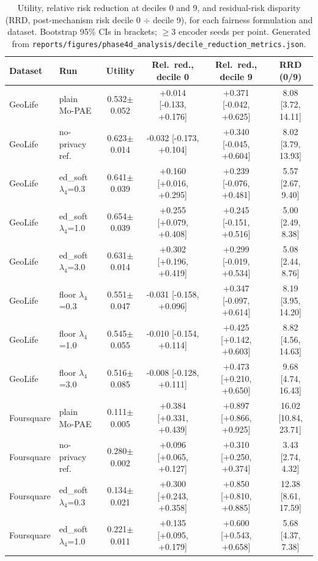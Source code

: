 \begin{table}[t]
\centering
\caption{Utility, relative risk reduction at deciles 0 and 9, and residual-risk disparity (RRD, post-mechanism risk decile 0 $\div$ decile 9), for each fairness formulation and dataset. Bootstrap 95\% CIs in brackets; $\geq 3$ encoder seeds per point. Generated from \texttt{reports/figures/phase4d\_analysis/decile\_reduction\_metrics.json}.}
\label{tab:04d-decile-reduction}
\small
\begin{tabular}{@{}llcccc@{}}
\toprule
Dataset & Run & Utility & Rel.\ red., decile 0 & Rel.\ red., decile 9 & RRD (0/9) \\
\midrule
GeoLife & plain Mo-PAE & 0.532$\pm$0.052 & +0.014 [-0.133, +0.176] & +0.371 [-0.042, +0.625] & 8.08 [3.72, 14.11] \\
GeoLife & no-privacy ref. & 0.623$\pm$0.014 & -0.032 [-0.173, +0.104] & +0.340 [-0.045, +0.604] & 8.02 [3.79, 13.93] \\
GeoLife & ed\_soft $\lambda_4$=0.3 & 0.641$\pm$0.039 & +0.160 [+0.016, +0.295] & +0.239 [-0.076, +0.481] & 5.57 [2.67, 9.40] \\
GeoLife & ed\_soft $\lambda_4$=1.0 & 0.654$\pm$0.039 & +0.255 [+0.079, +0.408] & +0.245 [-0.151, +0.516] & 5.00 [2.49, 8.38] \\
GeoLife & ed\_soft $\lambda_4$=3.0 & 0.631$\pm$0.014 & +0.302 [+0.196, +0.419] & +0.299 [-0.019, +0.534] & 5.08 [2.44, 8.76] \\
GeoLife & floor $\lambda_4$=0.3 & 0.551$\pm$0.047 & -0.031 [-0.158, +0.096] & +0.347 [-0.097, +0.614] & 8.19 [3.95, 14.20] \\
GeoLife & floor $\lambda_4$=1.0 & 0.545$\pm$0.055 & -0.010 [-0.154, +0.114] & +0.425 [+0.142, +0.603] & 8.82 [4.56, 14.63] \\
GeoLife & floor $\lambda_4$=3.0 & 0.516$\pm$0.085 & -0.008 [-0.128, +0.111] & +0.473 [+0.210, +0.650] & 9.68 [4.74, 16.43] \\
\addlinespace
Foursquare & plain Mo-PAE & 0.111$\pm$0.005 & +0.384 [+0.331, +0.439] & +0.897 [+0.866, +0.925] & 16.02 [10.84, 23.71] \\
Foursquare & no-privacy ref. & 0.280$\pm$0.002 & +0.096 [+0.065, +0.127] & +0.310 [+0.250, +0.374] & 3.43 [2.74, 4.32] \\
Foursquare & ed\_soft $\lambda_4$=0.3 & 0.134$\pm$0.021 & +0.300 [+0.243, +0.358] & +0.850 [+0.810, +0.885] & 12.38 [8.61, 17.59] \\
Foursquare & ed\_soft $\lambda_4$=1.0 & 0.221$\pm$0.011 & +0.135 [+0.095, +0.179] & +0.600 [+0.543, +0.658] & 5.68 [4.37, 7.38] \\

\end{tabular}
\end{table}
